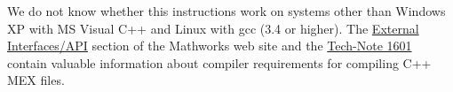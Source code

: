 We do not know whether this instructions work on systems other than Windows XP
with MS Visual C++ and Linux with gcc (3.4 or higher). The
\href{http://www.mathworks.com/access/helpdesk/help/techdoc/matlab_external/matlab_external.shtml}{External
  Interfaces/API} section of the Mathworks web site and the
\href{http://www.mathworks.com/support/tech-notes/1600/1601.shtml}{Tech-Note
  1601} contain valuable information about compiler requirements for compiling
C++ MEX files.

